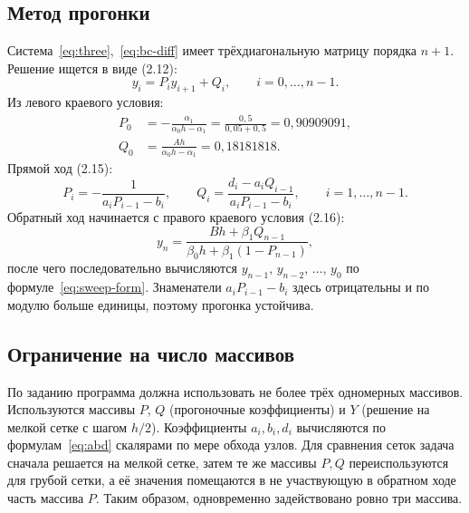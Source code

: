 \documentclass[14pt,a4paper]{extarticle}
\begin{document}
\subsection{Метод прогонки}

Система~\eqref{eq:three},~\eqref{eq:bc-diff} имеет трёхдиагональную матрицу
порядка $n+1$. Решение ищется в виде (2.12):
\begin{equation}
    y_i = P_i y_{i+1} + Q_i, \qquad i=0,\ldots,n-1 .
    \label{eq:sweep-form}
\end{equation}
Из левого краевого условия:
\begin{equation}
    \begin{aligned}
        P_0 &= -\frac{\alpha_1}{\alpha_0 h-\alpha_1}
              = \frac{0{,}5}{0{,}05+0{,}5} = 0{,}90909091,\\
        Q_0 &= \frac{Ah}{\alpha_0 h-\alpha_1}
              = 0{,}18181818 .
    \end{aligned}
    \label{eq:sweep-start}
\end{equation}
Прямой ход (2.15):
\begin{equation}
    P_i = -\frac{1}{a_i P_{i-1}-b_i},\qquad
    Q_i = \frac{d_i-a_i Q_{i-1}}{a_i P_{i-1}-b_i},
    \qquad i=1,\ldots,n-1 .
    \label{eq:sweep-forward}
\end{equation}
Обратный ход начинается с правого краевого условия (2.16):
\begin{equation}
    y_n = \frac{Bh+\beta_1 Q_{n-1}}
               {\beta_0 h+\beta_1(1-P_{n-1})},
    \label{eq:sweep-last}
\end{equation}
после чего последовательно вычисляются
$y_{n-1},\,y_{n-2},\,\ldots,\,y_0$ по формуле~\eqref{eq:sweep-form}.
Знаменатели $a_iP_{i-1}-b_i$ здесь отрицательны и по модулю больше единицы,
поэтому прогонка устойчива.

\subsection{Ограничение на число массивов}

По заданию программа должна использовать не более трёх одномерных
массивов. Используются массивы $P$, $Q$ (прогоночные коэффициенты) и $Y$
(решение на мелкой сетке с шагом $h/2$). Коэффициенты $a_i,b_i,d_i$
вычисляются по формулам~\eqref{eq:abd} скалярами по мере обхода узлов.
Для сравнения сеток задача сначала решается на мелкой сетке, затем те же
массивы $P,Q$ переиспользуются для грубой сетки, а её значения помещаются
в не участвующую в обратном ходе часть массива $P$. Таким образом,
одновременно задействовано ровно три массива.
\end{document}
